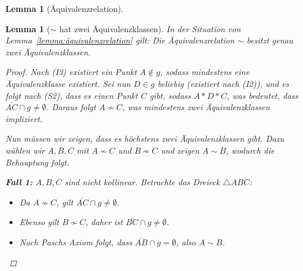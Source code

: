 \documentclass[a4paper,12pt]{article}
\theoremstyle{break}
\newtheorem{lemma}[definition]{Lemma}
\begin{document}
\begin{lemma}[Äquivalenzrelation]
\begin{center}
\end{center}
\end{lemma}

\begin{lemma}[$\sim$ hat zwei Äquivalenzklassen]\label{lemma:zwei_äquivalenz}
In der Situation von Lemma~\ref{lemma:äquivalenzrelation} gilt: Die Äquivalenzrelation $\sim$ besitzt genau zwei Äquivalenzklassen.

\begin{proof} 
Nach (I3) existiert ein Punkt $A \notin g$, sodass mindestens eine Äquivalenzklasse existiert. Sei nun $D \in g$ beliebig (existiert nach (I2)), und es folgt nach (S2), dass es einen Punkt $C$ gibt, sodass $A * D * C$, was bedeutet, dass $\overline{AC} \cap g \neq \emptyset$. Daraus folgt $A \not\sim C$, was mindestens zwei Äquivalenzklassen impliziert.

Nun müssen wir zeigen, dass es höchstens zwei Äquivalenzklassen gibt. Dazu wählen wir $A, B, C$ mit $A \not\sim C$ und $B \not\sim C$ und zeigen $A \sim B$, wodurch die Behauptung folgt.

\textbf{Fall 1:} $A, B, C$ sind nicht kollinear.  
Betrachte das Dreieck $\triangle ABC$:  
\begin{itemize}
  \item Da $A \not\sim C$, gilt $\overline{AC} \cap g \neq \emptyset$.
  \item Ebenso gilt $B \not\sim C$, daher ist $\overline{BC} \cap g \neq \emptyset$.
  \item Nach Paschs Axiom folgt, dass $\overline{AB} \cap g = \emptyset$, also $A \sim B$.
\end{itemize}


\end{proof}
\end{lemma}
\end{document}
